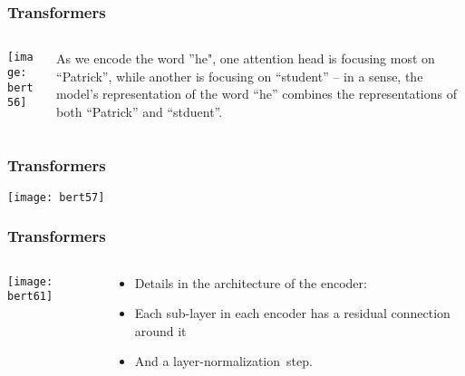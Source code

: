 \begin{frame}[fragile]\frametitle{Transformers}

\begin{columns}
    \begin{column}[T]{0.5\linewidth}
			\begin{center}
			\texttt{[image: bert56]}
			\end{center}		
		\end{column}
    \begin{column}[T]{0.5\linewidth}
As we encode the word ”he", one attention head is focusing most on ``Patrick'', while another is focusing on ``student'' -- in a sense, the model's representation of the word ``he'' combines the representations of both ``Patrick'' and ``stduent''.

    \end{column}
  \end{columns}
			
\end{frame}

\begin{frame}[fragile]\frametitle{Transformers}


			\begin{center}
			\texttt{[image: bert57]}
			\end{center}		

			
\end{frame}


\begin{frame}[fragile]\frametitle{Transformers}

\begin{columns}
    \begin{column}[T]{0.5\linewidth}
			\begin{center}
			\texttt{[image: bert61]}
			\end{center}		
		\end{column}
    \begin{column}[T]{0.5\linewidth}
      \begin{itemize}
			\item Details in the architecture of the encoder:
			\item Each sub-layer  in each encoder has a residual connection around it
			\item And a layer-normalization step.
			\end{itemize}
    \end{column}
  \end{columns}
			
\end{frame}


